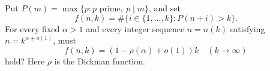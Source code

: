 Put $P(m)=\max\{p:p\text{ prime},\ p\mid m\}$, and set
\[f(n,k)=\#\{i\in\{1,\ldots,k\}:P(n+i)>k\}.\]
For every fixed $\alpha>1$ and every integer sequence $n=n(k)$ satisfying $n=k^{\alpha+o(1)}$, must
\[f(n,k)=(1-\rho(\alpha)+o(1))k\quad(k\to\infty)\]
hold? Here $\rho$ is the Dickman function.
